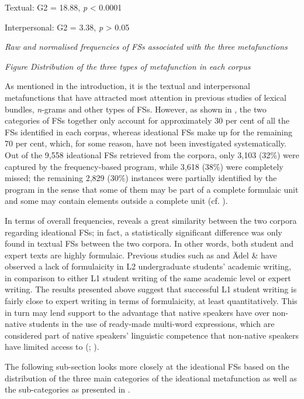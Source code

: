 Textual: G2 = 18.88, \textit{p} < 0.0001

Interpersonal: G2 = 3.38, \textit{p} > 0.05

\textit{ Raw and normalised frequencies of FSs associated with the three metafunctions}

\begin{stylecaption}
\textmd{\textit{Figure  Distribution of the three types of metafunction in each corpus}}
\end{stylecaption}

As mentioned in the introduction, it is the textual and interpersonal metafunctions that have attracted most attention in previous studies of lexical bundles, \textit{n}{}-grams and other types of FSs. However, as shown in , the two categories of FSs together only account for approximately 30 per cent of all the FSs identified in each corpus, whereas ideational FSs make up for the remaining 70 per cent, which, for some reason, have not been investigated systematically. Out of the 9,558 ideational FSs retrieved from the corpora, only 3,103 (32\%) were captured by the frequency-based program, while 3,618 (38\%) were completely missed; the remaining 2,829 (30\%) instances were partially identified by the program in the sense that some of them may be part of a complete formulaic unit and some may contain elements outside a complete unit (cf. ). 

In terms of overall frequencies,  reveals a great similarity between the two corpora regarding ideational FSs; in fact, a statistically significant difference was only found in textual FSs between the two corpora. In other words, both student and expert texts are highly formulaic. Previous studies such as \citet{ChenBaker2010} and Ädel \& \citet{Erman2012} have observed a lack of formulaicity in L2 undergraduate students’ academic writing, in comparison to either L1 student writing of the same academic level or expert writing. The results presented above suggest that successful L1 student writing is fairly close to expert writing in terms of formulaicity, at least quantitatively. This in turn may lend support to the advantage that native speakers have over non-native students in the use of ready-made multi-word expressions, which are considered part of native speakers’ linguistic competence that non-native speakers have limited access to (\citealt{Wray2002,20082002}; \citealt{Kecskes2016}).  

The following sub-section looks more closely at the ideational FSs based on the distribution of the three main categories of the ideational metafunction as well as the sub-categories as presented in .

